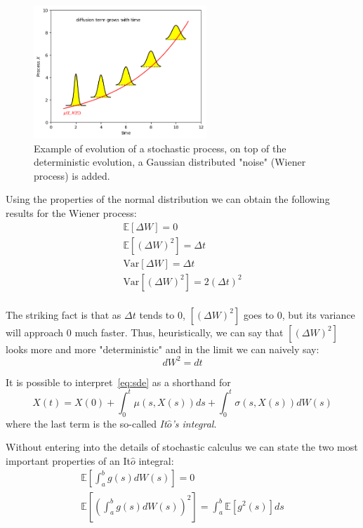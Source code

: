 \documentclass[12pt,a4paper]{book}
\begin{document}
\begin{figure}[htpb]
\begin{center}
	\includegraphics[height=5cm]{brownian_process}
\end{center}
\caption{Example of evolution of a stochastic process, on top of the deterministic evolution, a Gaussian distributed "noise" (Wiener process) is added.}
\end{figure}

Using the properties of the normal distribution we can obtain the following results for the Wiener process:
\begin{equation*}
\begin{gathered}
\mathbb{E}[\Delta W] = 0 \\
\mathbb{E}[(\Delta W)^2] = \Delta t \\
\text{Var}[\Delta W] = \Delta t \\
\text{Var}[(\Delta W)^2] = 2(\Delta t)^2 \\
\end{gathered}
\end{equation*}

The striking fact is that as $\Delta t$ tends to 0, $[(\Delta W)^2]$ goes to 0, but its variance will approach 0 much faster.
Thus, heuristically, we can say that $[(\Delta W)^2]$ looks more and more "deterministic" and in the limit we can naively say:
\begin{equation*}
\boxed{dW^2 = dt}
\end{equation*}

It is possible to interpret~\ref{eq:sde} as a shorthand for 
\begin{equation*}
X(t) = X(0) + \int_0^t \mu(s,X(s)) ds + \int_0^t \sigma(s,X(s)) dW(s)
\end{equation*}
where the last term is the so-called \emph{It$\hat{o}$'s integral}.

Without entering into the details of stochastic calculus we can state the two most important properties of an It$\hat{o}$ integral:
\begin{equation*}
\begin{gathered}
\mathbb{E}\left[\int_a^b g(s) dW(s)\right] = 0 \\
\mathbb{E}\left[\left(\int_a^b g(s) dW(s)\right)^2\right] = \int_a^b\mathbb{E}[g^2(s)]ds\\
\end{gathered}
\end{equation*}
\end{document}
